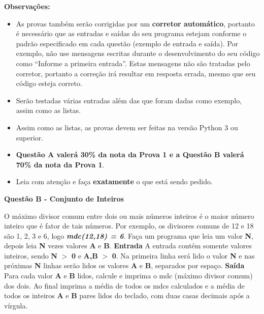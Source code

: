 \documentclass[a4paper, 12pt]{article}
\begin{document}
\textbf{{\large Observações:}}
\begin{itemize}
	\item As provas também serão corrigidas por um \textbf{corretor automático}, portanto é necessário que as entradas e saídas do seu programa estejam conforme o padrão especificado em cada questão (exemplo de entrada e saída). Por exemplo, não use mensagens escritas durante o desenvolvimento do seu código como “Informe a primeira entrada”. Estas mensagens não são tratadas pelo corretor, portanto a correção irá resultar em resposta errada, mesmo que seu código esteja correto.
	\item Serão testadas várias entradas além das que foram dadas como exemplo, assim como as listas.
	\item Assim como as listas, as provas devem ser feitas na versão Python 3 ou superior.
	\item \textbf{Questão A valerá 30\% da nota da Prova 1 e a Questão B valerá 70\% da nota da Prova 1}.
	\item Leia com atenção e faça \textbf{exatamente} o que está sendo pedido.
\end{itemize}
\newpage %
\begin{center}
\textbf{{\Large Questão B - Conjunto de Inteiros}}
\end{center}
\vspace{5pt}
O máximo divisor comum entre dois ou mais números inteiros é o maior número inteiro que é fator de tais números. Por exemplo, os divisores comuns de 12 e 18 são 1, 2, 3 e 6, logo \textbf{\textit{mdc(12,18) = 6}}. \newline \newline
Faça um programa que leia um valor \textbf{N}, depois leia \textbf{N} vezes valores \textbf{A} e \textbf{B}.
\newline \newline
\textbf{{\large Entrada}} \newline
A entrada contém somente valores inteiros, sendo \textbf{N} $>$ \textbf{0} e \textbf{A,B} $>$ \textbf{0}. Na primeira linha será lido o valor \textbf{N} e nas próximas \textbf{N} linhas serão lidos os valores \textbf{A} e \textbf{B}, separados por espaço.
\newline \newline
\textbf{{\large Saída}} \newline
Para cada valor \textbf{A} e \textbf{B} lidos, calcule e imprima o mdc (máximo divisor comum) dos dois. Ao final imprima a média de todos os mdcs calculados e a média de todos os inteiros \textbf{A} e \textbf{B} pares lidos do teclado, com duas casas decimais após a vírgula. 
\end{document}
